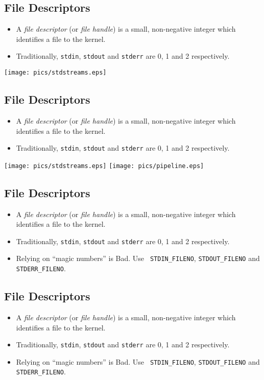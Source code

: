 \documentclass[xga]{xdvislides}
\begin{document}
\subsection{File Descriptors}
\begin{itemize}
	\item A {\em file descriptor} (or {\em file handle}) is a small,
		non-negative integer which identifies a file to the kernel.
	\item Traditionally, {\tt stdin}, {\tt stdout} and {\tt stderr}
		are 0, 1 and 2 respectively.
\end{itemize}
\texttt{[image: pics/stdstreams.eps]}

\subsection{File Descriptors}
\begin{itemize}
	\item A {\em file descriptor} (or {\em file handle}) is a small,
		non-negative integer which identifies a file to the kernel.
	\item Traditionally, {\tt stdin}, {\tt stdout} and {\tt stderr}
		are 0, 1 and 2 respectively.
\end{itemize}
\texttt{[image: pics/stdstreams.eps]}
\texttt{[image: pics/pipeline.eps]}



\subsection{File Descriptors}
\begin{itemize}
	\item A {\em file descriptor} (or {\em file handle}) is a small,
		non-negative integer which identifies a file to the kernel.
	\item Traditionally, {\tt stdin}, {\tt stdout} and {\tt stderr}
		are 0, 1 and 2 respectively.
	\item Relying on ``magic numbers'' is Bad\texttrademark.  Use {\tt
		STDIN\_FILENO}, {\tt STDOUT\_FILENO} and {\tt STDERR\_FILENO}.
\end{itemize}

\subsection{File Descriptors}
\begin{itemize}
	\item A {\em file descriptor} (or {\em file handle}) is a small,
		non-negative integer which identifies a file to the kernel.
	\item Traditionally, {\tt stdin}, {\tt stdout} and {\tt stderr}
		are 0, 1 and 2 respectively.
	\item Relying on ``magic numbers'' is Bad\texttrademark.  Use {\tt
		STDIN\_FILENO}, {\tt STDOUT\_FILENO} and {\tt STDERR\_FILENO}.
\end{itemize}
\end{document}
